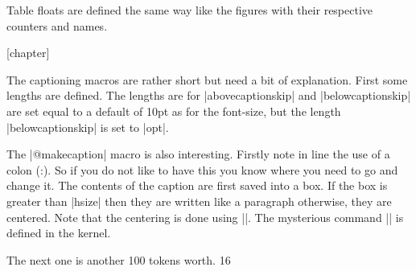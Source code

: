 \begin{multicols}{2}
 Table floats are defined the same way like the figures with their respective counters and names.  
\end{multicols}

\begin{teX}
[chapter]
\renewcommand \thetable
     {\ifnum \c@chapter>\z@ \thechapter.\fi \@arabic\c@table}
\def\fps@table{tbp}
\def\ftype@table{2}
\def\ext@table{lot}
\def\fnum@table{\tablename\nobreakspace\thetable}


\newenvironment{table}
               {\@float{table}}
               {\end@float}

\newenvironment{table*}
               {\@dblfloat{table}}
               {\end@dblfloat}
\end{teX}

\begin{multicols}{2}
The captioning macros are rather short but need a bit of explanation. First
some lengths are defined. The lengths are for |abovecaptionskip| and |belowcaptionskip| are set equal to a default of 10pt as for the font-size, but the length |belowcaptionskip| is set to |opt|.
\end{multicols}

\begin{teX}
\newlength\abovecaptionskip
\newlength\belowcaptionskip
\setlength{}
\setlength{}

\long{}
\end{teX}

\begin{multicols}{2}
The |@makecaption| macro is also interesting. Firstly note in line  the use of a colon (:). So if you do not like to have this you know where you need to go and change it. The contents of the caption are first saved into a box. If the box is greater than |hsize| then they are written like a paragraph otherwise, they are centered. Note that the centering is done using |\hfil\box\@tempoxa\hfil|. The mysterious command |\hb@xt| is defined in the kernel.
\end{multicols}

\begin{teXXX}
  \hb@xt@ The next one is another 100 tokens worth.
  16 \def\hb@xt@{\hbox to}
\end{teXXX}

